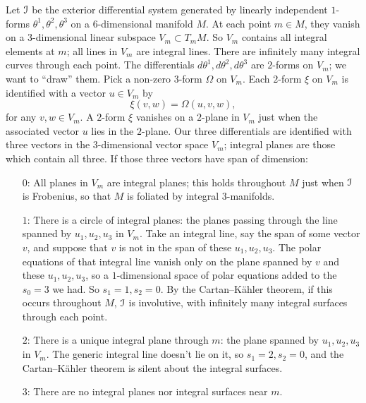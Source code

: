\begin{example}
Let \(\mathcal{I}\) be the exterior differential system generated by linearly independent \(1\)-forms \(\theta^1,\theta^2,\theta^3\) on a \(6\)-dimensional manifold \(M\).
At each point \(m\in M\), they vanish on a \(3\)-dimensional linear subspace \(V_m\subset T_m M\).
So \(V_m\) contains all integral elements at \(m\); all lines in \(V_m\) are integral lines.
There are infinitely many integral curves through each point.
The differentials \(d\theta^1,d\theta^2,d\theta^3\) are \(2\)-forms on \(V_m\); we want to ``draw'' them. 
Pick a non-zero \(3\)-form \(\Omega\) on \(V_m\).
Each \(2\)-form \(\xi\) on \(V_m\) is identified with a vector \(u\in V_m\) by
\[
\xi(v,w)=\Omega(u,v,w),
\]
for any \(v,w\in V_m\).
A \(2\)-form \(\xi\) vanishes on a \(2\)-plane in \(V_m\) just when the associated vector \(u\) lies in the \(2\)-plane.
Our three differentials are identified with three vectors in the \(3\)-dimensional vector space \(V_m\); integral planes are those which contain all three. 
If those three vectors have span of dimension:
\begin{itemize}
\item[$0$:]
All planes in \(V_m\) are integral planes; this holds throughout \(M\) just when \(\mathcal{I}\) is Frobenius, so that \(M\) is foliated by integral \(3\)-manifolds.
\item[$1$:]
There is a circle of integral planes: the planes passing through the line spanned by \(u_1,u_2,u_3\) in \(V_m\).
Take an integral line, say the span of some vector \(v\), and suppose that \(v\) is not in the span of these \(u_1,u_2,u_3\).
The polar equations of that integral line vanish only on the plane spanned by \(v\) and these \(u_1,u_2,u_3\), so a \(1\)-dimensional space of polar equations added to the \(s_0=3\) we had.
So \(s_1=1,s_2=0\).
By the Cartan--K\"ahler theorem, if this occurs throughout \(M\), \(\mathcal{I}\) is involutive, with infinitely many integral surfaces through each point.
\item[$2$:]
There is a unique integral plane through \(m\): the plane spanned by \(u_1,u_2,u_3\) in \(V_m\).
The generic integral line doesn't lie on it, so \(s_1=2,s_2=0\), and the Cartan--K\"ahler theorem is silent about the integral surfaces.
\item[$3$:]
There are no integral planes nor integral surfaces near \(m\).
\end{itemize}
\end{example}
